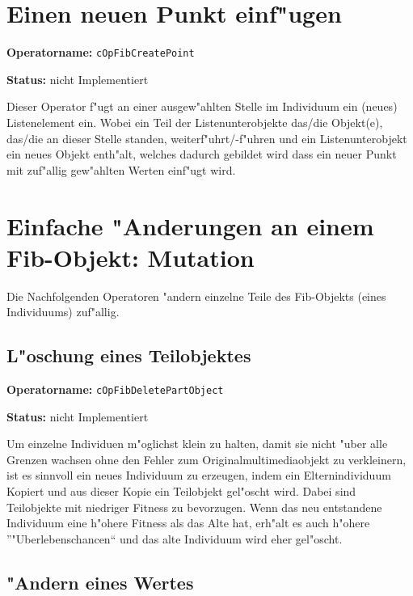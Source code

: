 

\section{Einen neuen Punkt einf"ugen}

\textbf{Operatorname:} \verb|cOpFibCreatePoint|

\bigskip\noindent
\textbf{Status:} nicht Implementiert

\bigskip\noindent
Dieser Operator f"ugt an einer ausgew"ahlten Stelle im Individuum ein (neues) Listenelement ein. Wobei ein Teil der Listenunterobjekte das/die Objekt(e), das/die an dieser Stelle standen, weiterf"uhrt/-f"uhren und ein Listenunterobjekt ein neues Objekt enth"alt, welches dadurch gebildet wird dass ein neuer Punkt mit zuf"allig gew"ahlten Werten einf"ugt wird.


\section{Einfache "Anderungen an einem Fib-Objekt: Mutation}

Die Nachfolgenden Operatoren "andern einzelne Teile des Fib-Objekts (eines Individuums) zuf"allig.


\subsection{L"oschung eines Teilobjektes}
\label{secOpFibDeletePartObject}

\textbf{Operatorname:} \verb|cOpFibDeletePartObject|

\bigskip\noindent
\textbf{Status:} nicht Implementiert

\bigskip\noindent
Um einzelne Individuen m"oglichst klein zu halten, damit sie nicht "uber alle Grenzen wachsen ohne den Fehler zum Originalmultimediaobjekt zu verkleinern, ist es sinnvoll ein neues Individuum zu erzeugen, indem ein Elternindividuum Kopiert und aus dieser Kopie ein Teilobjekt gel"oscht wird. Dabei sind Teilobjekte mit niedriger Fitness zu bevorzugen.
Wenn das neu entstandene Individuum eine h"ohere Fitness als das Alte hat, erh"alt es auch h"ohere ''"Uberlebenschancen`` und das alte Individuum wird eher gel"oscht.


\subsection{"Andern eines Wertes}

